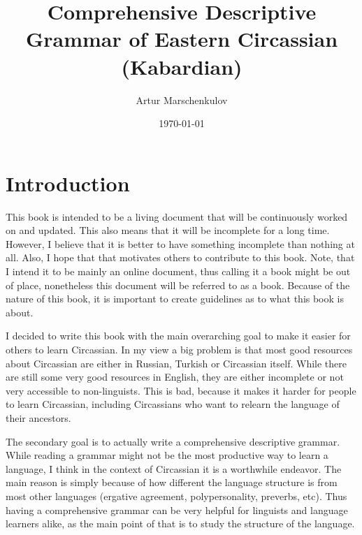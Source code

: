 \documentclass[a4paper, 10pt]{book}
\begin{document}
\title{Comprehensive Descriptive Grammar of Eastern Circassian (Kabardian)}
\author{Artur Marschenkulov}
\date{\today}


\newcommand{\mywordcre}[3]{\textbf{#1} \textit{#2} `{#3}'}
\newcommand{\mywordcr}[2]{\textbf{#1} \textit{#2}}
\newcommand{\myworde}[1]{`{#1}'}



\maketitle

\tableofcontents


\chapter{Introduction}
This book is intended to be a living document that will be continuously worked on and updated. This also means that it will be incomplete for a long time. However, I believe that it is better to have something incomplete than nothing at all. Also, I hope that that motivates others to contribute to this book. Note, that I intend it to be mainly an online document, thus calling it a book might be out of place, nonetheless this document will be referred to as a book. Because of the nature of this book, it is important to create guidelines as to what this book is about.

I decided to write this book with the main overarching goal to make it easier for others to learn Circassian. In my view a big problem is that most good resources about Circassian are either in Russian, Turkish or Circassian itself. While there are still some very good resources in English, they are either incomplete or not very accessible to non-linguists. This is bad, because it makes it harder for people to learn Circassian, including Circassians who want to relearn the language of their ancestors.

The secondary goal is to actually write a comprehensive descriptive grammar. While reading a grammar might not be the most productive way to learn a language, I think in the context of Circassian it is a worthwhile endeavor. The main reason is simply because of how different the language structure is from most other languages (ergative agreement, polypersonality, preverbs, etc). Thus having a comprehensive grammar can be very helpful for linguists and language learners alike, as the main point of that is to study the structure of the language.
\end{document}
